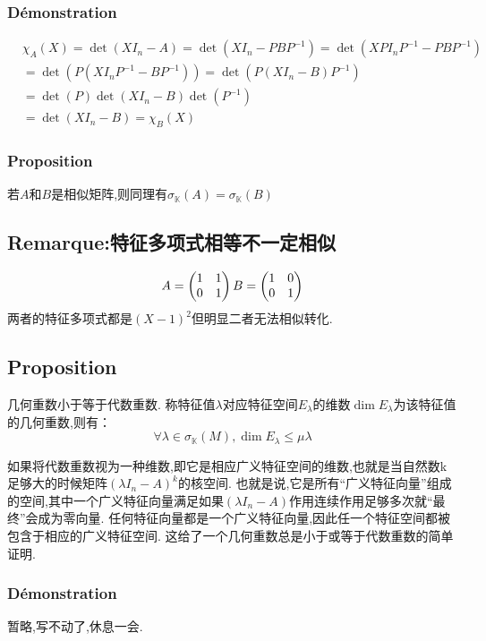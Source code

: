 \documentclass[12pt, a4paper, oneside]{ctexbook}
\begin{document}
  \subsubsection{Démonstration}
  $$
  \begin{aligned}
  &  \chi _A(X)=\det(XI_n-A)=\det(XI_n-PBP^{-1})=\det(XPI_nP^{-1}-PBP^{-1})\\
  &  =\det(P(XI_nP^{-1}-BP^{-1}))=\det(P(XI_n-B)P^{-1})\\
  &  =\det(P)\det(XI_n-B)\det(P^{-1})\\
  &  =\det(XI_n-B)=\chi _B(X)
    \end{aligned}
  $$
  \subsubsection{Proposition}
  若$A$和$B$是相似矩阵,则同理有$\sigma_{\mathbb{K}}(A)=\sigma_{\mathbb{K}}(B)$
  \subsection{Remarque:特征多项式相等不一定相似}
  
  \begin{equation}
    \notag
    A=\begin{pmatrix} 1 & 1 \\ 0 & 1 \end{pmatrix}
    B=\begin{pmatrix} 1 & 0 \\ 0 & 1 \end{pmatrix}
  \end{equation}
  两者的特征多项式都是$(X-1)^2$但明显二者无法相似转化.
  \subsection{Proposition}
  几何重数小于等于代数重数.
  称特征值$\lambda$对应特征空间$E_\lambda$的维数$\dim E_\lambda$为该特征值的几何重数,则有：
  $$
    \forall\lambda\in\sigma_{\mathbb{K}}(M), \dim E_\lambda\leq\mu\lambda
  $$


  如果将代数重数视为一种维数,即它是相应广义特征空间的维数,也就是当自然数k足够大的时候矩阵$(\lambda I_n-A)^k$的核空间.
  也就是说,它是所有“广义特征向量”组成的空间,其中一个广义特征向量满足如果$(\lambda I_n-A)$作用连续作用足够多次就“最终”会成为零向量.
  任何特征向量都是一个广义特征向量,因此任一个特征空间都被包含于相应的广义特征空间.
  这给了一个几何重数总是小于或等于代数重数的简单证明.
  \subsubsection{Démonstration}
  暂略,写不动了,休息一会.
\end{document}
